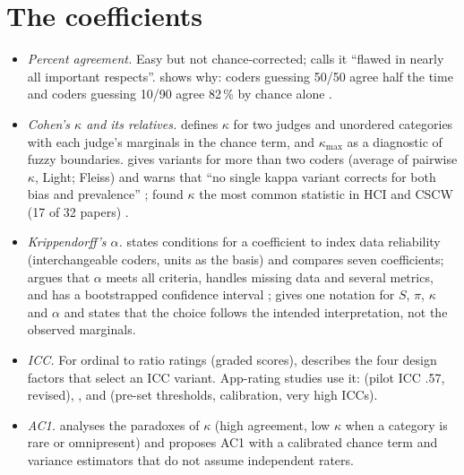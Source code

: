 \section{The coefficients}
\begin{itemize}
\item \emph{Percent agreement.} Easy but not chance-corrected;  calls it ``flawed in nearly all important respects''.  shows why: coders guessing 50/50 agree half the time and coders guessing 10/90 agree 82\,\% by chance alone .
\item \emph{Cohen's $\kappa$ and its relatives.}  defines $\kappa$ for two judges and unordered categories with each judge's marginals in the chance term, and $\kappa_{\max}$ as a diagnostic of fuzzy boundaries.  gives variants for more than two coders (average of pairwise $\kappa$, Light; Fleiss) and warns that ``no single kappa variant corrects for both bias and prevalence'' ;  found $\kappa$ the most common statistic in HCI and CSCW (17 of 32 papers) .
\item \emph{Krippendorff's $\alpha$.}  states conditions for a coefficient to index data reliability (interchangeable coders, units as the basis) and compares seven coefficients;  argues that $\alpha$ meets all criteria, handles missing data and several metrics, and has a bootstrapped confidence interval ;  gives one notation for $S$, $\pi$, $\kappa$ and $\alpha$ and states that the choice follows the intended interpretation, not the observed marginals.
\item \emph{ICC.} For ordinal to ratio ratings (graded scores),  describes the four design factors that select an ICC variant. App-rating studies use it:  (pilot ICC .57, revised), ,  and  (pre-set thresholds, calibration, very high ICCs).
\item \emph{AC1.}  analyses the paradoxes of $\kappa$ (high agreement, low $\kappa$ when a category is rare or omnipresent) and proposes AC1 with a calibrated chance term and variance estimators that do not assume independent raters.
\end{itemize}

